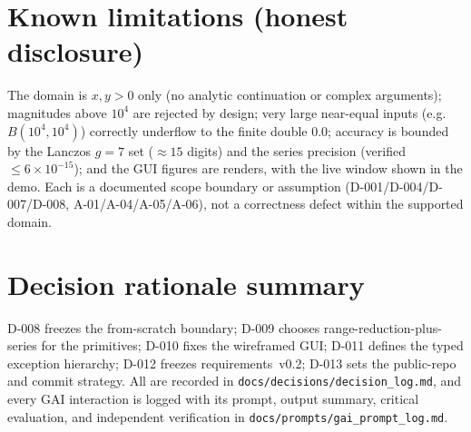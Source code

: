\documentclass[11pt,a4paper]{article}
\begin{document}
\section{Known limitations (honest disclosure)}
The domain is $x,y>0$ only (no analytic continuation or complex arguments);
magnitudes above $10^{4}$ are rejected by design; very large near-equal inputs
(e.g.\ $B(10^{4},10^{4})$) correctly underflow to the finite double $0.0$;
accuracy is bounded by the Lanczos $g{=}7$ set ($\approx15$ digits) and the
series precision (verified $\le6\times10^{-15}$); and the GUI figures are renders,
with the live window shown in the demo. Each is a documented scope boundary or
assumption (D-001/D-004/D-007/D-008, A-01/A-04/A-05/A-06), not a correctness
defect within the supported domain.

\section{Decision rationale summary}
D-008 freezes the from-scratch boundary; D-009 chooses range-reduction-plus-series
for the primitives; D-010 fixes the wireframed GUI; D-011 defines the typed
exception hierarchy; D-012 freezes requirements~v0.2; D-013 sets the public-repo
and commit strategy. All are recorded in
\texttt{docs/decisions/decision\_log.md}, and every GAI interaction is logged with
its prompt, output summary, critical evaluation, and independent verification in
\texttt{docs/prompts/gai\_prompt\_log.md}.



\end{document}
